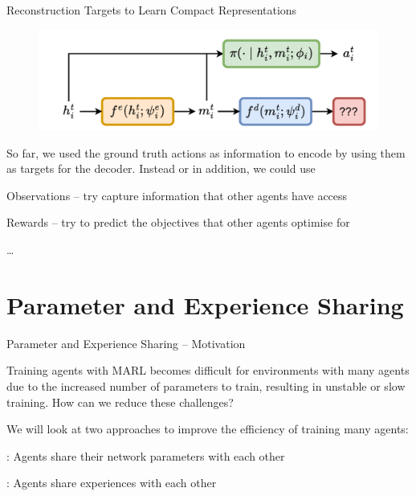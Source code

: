 \begin{frame}[t]{Reconstruction Targets to Learn Compact Representations}
    \begin{figure}
        \centering
        \includegraphics[width=.65\textwidth]{figures/agent_modelling_encoder_decoder_targets.pdf}
    \end{figure}

    \vspace{-2em}

    \begin{notebox}
        So far, we used the ground truth actions as information to encode by using them as targets for the decoder. Instead or in addition, we could use
        \blist
            \item Observations -- try capture information that other agents have access
            \item Rewards -- try to predict the objectives that other agents optimise for
            \item \ldots
        \elist
    \end{notebox}
\end{frame}

\section{Parameter and Experience Sharing}

\begin{frame}[t]{Parameter and Experience Sharing -- Motivation}
    \begin{problembox}
        Training agents with MARL becomes difficult for environments with many agents due to the increased number of parameters to train, resulting in unstable or slow training. How can we reduce these challenges?
    \end{problembox}

    \pause

    \begin{solutionbox}
        We will look at two approaches to improve the efficiency of training many agents:
        \blist
            \item {}: Agents share their network parameters with each other
            \item {}: Agents share experiences with each other
        \elist
    \end{solutionbox}
\end{frame}


